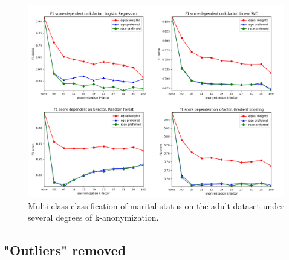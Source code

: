 \documentclass{llncs}
\begin{document}
\begin{figure}[H]
	\centering
	\includegraphics[width=1\textwidth]{figures/anonymization/adults_marital_status/anon_marital_combined}
	\caption{Multi-class classification of marital status on the adult dataset under several degrees of k-anonymization.}
	\label{fig:results_anonymization_marital_status}
\end{figure}




\subsection{"Outliers" removed}
\label{ssect:outliers_removed}
\end{document}
